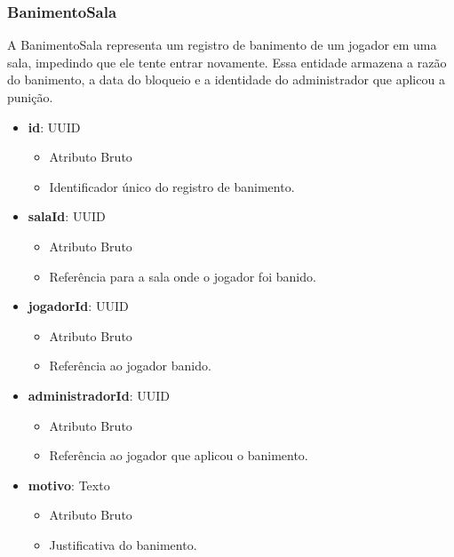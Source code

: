     \subsubsection{BanimentoSala}
    A BanimentoSala representa um registro de banimento de um jogador em uma sala, impedindo que ele tente entrar novamente. Essa entidade armazena a razão do banimento, a data do bloqueio e a identidade do administrador que aplicou a punição.
    \begin{itemize}
        \item \textbf{id}: UUID  
              \begin{itemize}
                  \item Atributo Bruto
                  \item Identificador único do registro de banimento.
              \end{itemize}
    
        \item \textbf{salaId}: UUID  
              \begin{itemize}
                  \item Atributo Bruto
                  \item Referência para a sala onde o jogador foi banido.
              \end{itemize}
    
        \item \textbf{jogadorId}: UUID  
              \begin{itemize}
                  \item Atributo Bruto
                  \item Referência ao jogador banido.
              \end{itemize}
    
        \item \textbf{administradorId}: UUID  
              \begin{itemize}
                  \item Atributo Bruto
                  \item Referência ao jogador que aplicou o banimento.
              \end{itemize}
    
        \item \textbf{motivo}: Texto  
              \begin{itemize}
                  \item Atributo Bruto
                  \item Justificativa do banimento.
              \end{itemize}
    

\end{itemize}

